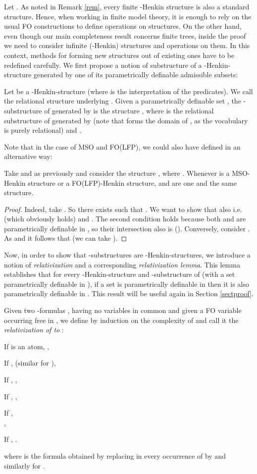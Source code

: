 \documentclass{LMCS}
\newcommand{\fo}{\textsf{FO}\xspace}
\newcommand{\mso}{\textsf{MSO}\xspace}
\newcommand{\folfp}{\textsf{FO(LFP)}\xspace}
\begin{document}
Let . As noted in Remark \ref{rem}, every finite -Henkin structure is also a standard structure.
Hence, when working in finite model theory, it is enough to rely on the usual \fo constructions to define operations on structures.
On the other hand, even though our main completeness result concerns finite trees, inside the proof we need to consider infinite (-Henkin) structures and operations on them. In this context, methods for forming new structures out of existing ones have to be redefined carefully.
We first propose a notion of substructure of a -Henkin-structure
generated by one of its parametrically definable admissible subsets:
\begin{defi}
[-substructure]
    Let  be a -Henkin-structure (where  is the interpretation of the predicates). We
    call  the relational structure underlying . Given a parametrically definable set , the
    -substructure of  generated by  is the structure ,
where  is the relational substructure of
 generated by  (note that  forms the domain of
, as the vocabulary is purely
relational) and .
\label{sub}
\end{defi}


Note that in the case of \mso and \folfp, we could also have defined  in an alternative way:


\begin{prop}
Take  and  as previously and consider the structure
,
where
. Whenever  is a \mso-Henkin structure or a \folfp-Henkin structure,  and  are one and the same structure.
\label{altsub}
\end{prop}
\begin{proof}
Indeed, take . So there exists  such that . We want to show that also  i.e.  (which obviously holds) and . The second condition holds because both  and  are parametrically definable in , so their intersection also is (). Conversely, consider . As
 and  it follows that  (we can take ).
\end{proof}
Now, in order to show that -substructures are -Henkin-structures, we introduce a notion of \emph{relativization} and a corresponding \emph{relativization lemma}.  This lemma establishes that for every -Henkin-structure  and -substructure  of  (with  a set parametrically definable in ), if a set is parametrically definable in  then it is also parametrically definable in . This result will be useful again in Section \ref{sectproof}.
\begin{defi}
Given two -formulas ,  having no variables
in common and given a \fo variable  occurring free in ,
we define  by induction on the complexity of
 and call it the \emph{relativization of  to
}:
\begin{iteMize}{}
 \item If  is an atom, ,
 \item If ,  (similar for ),
 \item If , ,
 \item If , ,
 \item If ,\\
  ,
 \item If , .
\end{iteMize}
where  is the formula obtained by replacing in  every occurrence of  by  and similarly for .
\end{defi}
\end{document}
